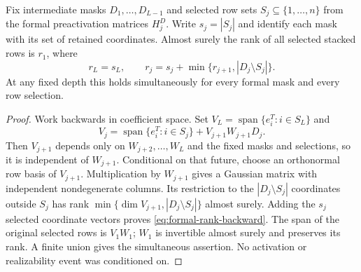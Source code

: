 \begin{lemma}\label{lem:formal-stack-rank}
Fix intermediate masks $D_1,\ldots,D_{L-1}$ and selected row sets $S_j\subseteq\{1,\ldots,n\}$ from the formal preactivation matrices $H_j^D$. Write $s_j=|S_j|$ and identify each mask with its set of retained coordinates. Almost surely the rank of all selected stacked rows is $r_1$, where
\begin{equation}\label{eq:formal-rank-backward}
r_L=s_L,\qquad r_j=s_j+\min\{r_{j+1},|D_j\setminus S_j|\}.
\end{equation}
At any fixed depth this holds simultaneously for every formal mask and every row selection.
\end{lemma}

\begin{proof}
Work backwards in coefficient space. Set $V_L=\operatorname{span}\{e_i^T:i\in S_L\}$ and
\[
V_j=\operatorname{span}\{e_i^T:i\in S_j\}+V_{j+1}W_{j+1}D_j.
\]
Then $V_{j+1}$ depends only on $W_{j+2},\ldots,W_L$ and the fixed masks and selections, so it is independent of $W_{j+1}$. Conditional on that future, choose an orthonormal row basis of $V_{j+1}$. Multiplication by $W_{j+1}$ gives a Gaussian matrix with independent nondegenerate columns. Its restriction to the $|D_j\setminus S_j|$ coordinates outside $S_j$ has rank $\min\{\dim V_{j+1},|D_j\setminus S_j|\}$ almost surely. Adding the $s_j$ selected coordinate vectors proves \cref{eq:formal-rank-backward}. The span of the original selected rows is $V_1W_1$; $W_1$ is invertible almost surely and preserves its rank. A finite union gives the simultaneous assertion. No activation or realizability event was conditioned on.
\end{proof}

